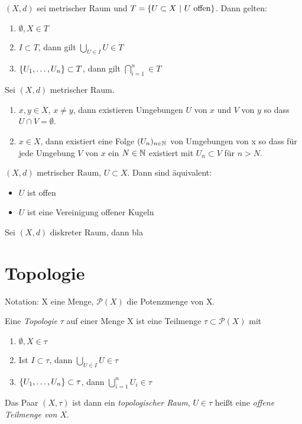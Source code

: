 \documentclass{skript}
\begin{document}
\begin{stz}
    $(X,d)$ sei metrischer Raum und $T = \mdef[U\subset X]{U\ \mathrm{offen}}$.
    Dann gelten:
    \begin{enumerate}
        \item $\emptyset, X \in T$
        \item $I \subset T$, dann gilt $\bigcup_{U\in I} U \in T$
        \item $\mdef{U_1, \ldots, U_n} \subset T$, dann gilt
              $\bigcap_{i=1}^n \in T$
    \end{enumerate}
\end{stz}

\begin{stz}
    Sei $(X, d)$ metrischer Raum.
    \begin{enumerate}
        \item $x,y \in X$, $x \ne y$, dann existieren Umgebungen $U$ von $x$ und $V$
              von $y$ so dass $U \cap V = \emptyset$.
        \item $x \in X$, dann existiert eine Folge $(U_n)_{n\in \mathbb{N}}$ von Umgebungen
            von x so dass für jede Umgebung $V$ von $x$ ein $N\in\mathbb{N}$ existiert mit
            $U_n \subset V$ für $n > N$.
    \end{enumerate}
\end{stz}

\begin{stz}
    $(X, d)$ metrischer Raum, $U \subset X$. Dann sind äquivalent:
    \begin{itemize}
        \item $U$ ist offen
        \item $U$ ist eine Vereinigung offener Kugeln
    \end{itemize}
\begin{bem}
    Sei $(X, d)$ diskreter Raum, dann bla
\end{bem}
\end{stz}

\section{Topologie}

Notation: X eine Menge, $\mathcal{P}(X)$ die Potenzmenge von X.

\begin{dfn}
    Eine \emph{Topologie} $\tau$ auf einer Menge X ist eine Teilmenge
    $\tau\subset\mathcal{P}(X)$ mit
    \begin{enumerate}
        \item $\emptyset, X \in \tau$
        \item Ist $I\subset \tau$, dann $\bigcup_{U\in I} U \in\tau$
        \item $\mdef{U_1, \ldots, U_n} \subset \tau$, dann
            $\bigcup_{i=1}^n U_i \in \tau$
    \end{enumerate}
    Das Paar $(X, \tau)$ ist dann ein \emph{topologischer Raum}, $U\in\tau$ heißt
    eine \emph{offene Teilmenge von $X$}.
\end{dfn}
\end{document}
